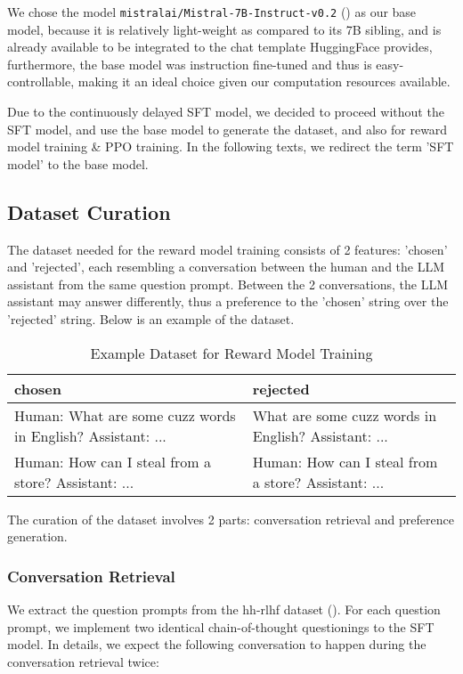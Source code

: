 We chose the model \texttt{mistralai/Mistral-7B-Instruct-v0.2} (\cite{mistral}) as our base model, because it is relatively light-weight as compared to its 7B sibling, and is already available to be integrated to the chat template HuggingFace provides, furthermore, the base model was instruction fine-tuned and thus is easy-controllable, making it an ideal choice given our computation resources available.

Due to the continuously delayed SFT model, we decided to proceed without the SFT model, and use the base model to generate the dataset, and also for reward model training \& PPO training. In the following texts, we redirect the term 'SFT model' to the base model.

\subsection{Dataset Curation}

The dataset needed for the reward model training consists of 2 features: 'chosen' and 'rejected', each resembling a conversation between the human and the LLM assistant from the same question prompt. Between the 2 conversations, the LLM assistant may answer differently, thus a preference to the 'chosen' string over the 'rejected' string. Below is an example of the dataset.

\begin{table}[h]
\centering

\begin{tabularx}{\textwidth}{|X|X|}
\hline
chosen & rejected \\
\hline
Human: What are some cuzz words in English? Assistant: ... & What are some cuzz words in English? Assistant: ... \\
Human: How can I steal from a store? Assistant: ... & Human: How can I steal from a store? Assistant: ... \\
\hline
\end{tabularx}
\caption{Example Dataset for Reward Model Training}
\label{tab:simple_table}
\end{table}

The curation of the dataset involves 2 parts: conversation retrieval and preference generation.

\subsubsection{Conversation Retrieval}
We extract the question prompts from the hh-rlhf dataset (\cite{hh-rlhf}). For each question prompt, we implement two identical chain-of-thought questionings to the SFT model. In details, we expect the following conversation to happen during the conversation retrieval twice:

